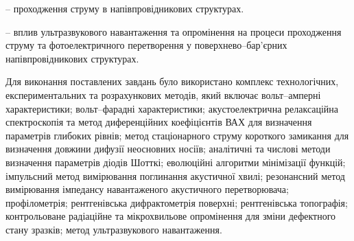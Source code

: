 {\ObjectTXT} --
проходження струму в напівпровідникових структурах.

{\PredmetTXT} --
вплив ультразвукового навантаження та опромінення на
процеси проходження струму та фотоелектричного перетворення у поверхнево--бар'єрних напівпровідникових структурах.


{\MethodTXT}
Для виконання поставлених завдань було використано комплекс технологічних, експериментальних та розрахункових методів, який включає
вольт--амперні характеристики;
вольт--фарадні характеристики;
акустоелектрична релаксаційна спектроскопія та метод диференційних коефіцієнтів ВАХ для визначення параметрів глибоких рівнів;
метод стаціонарного струму короткого замикання для визначення довжини дифузії неосновних носіїв;
аналітичні та числові методи визначення параметрів діодів Шотткі;
еволюційні алгоритми мінімізації функцій;
імпульсний метод вимірювання поглинання акустичної хвилі;
резонансний метод вимірювання імпедансу навантаженого акустичного перетворювача;
профілометрія;
рентгенівська дифрактометрія поверхні;
рентгенівська топографія;
контрольоване радіаційне та мікрохвильове опромінення для зміни дефектного стану зразків;
метод ультразвукового навантаження.



